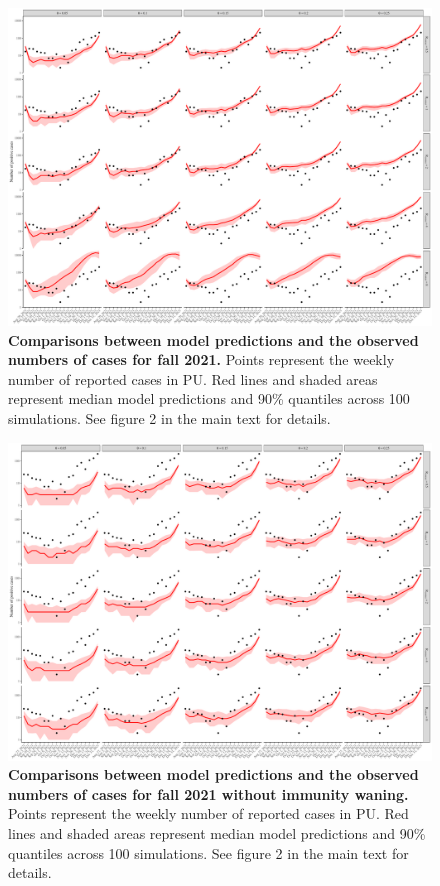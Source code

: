 \documentclass[12pt]{article}
\begin{document}
\pagebreak

\begin{figure}[!htp]
\includegraphics[width=\textwidth]{../figure_princeton_new/figure_princeton_simulation_fall_2021_all.pdf}
\caption{
\textbf{Comparisons between model predictions and the observed numbers of cases for fall 2021.}
Points represent the weekly number of reported cases in PU.
Red lines and shaded areas represent median model predictions and 90\% quantiles across 100 simulations.
See figure 2 in the main text for details.
}
\end{figure}

\pagebreak

\begin{figure}[!htp]
\includegraphics[width=\textwidth]{../figure_princeton_new/figure_princeton_simulation_nowaning.pdf}
\caption{
\textbf{Comparisons between model predictions and the observed numbers of cases for fall 2021 without immunity waning.}
Points represent the weekly number of reported cases in PU.
Red lines and shaded areas represent median model predictions and 90\% quantiles across 100 simulations.
See figure 2 in the main text for details.
}
\end{figure}
\end{document}
